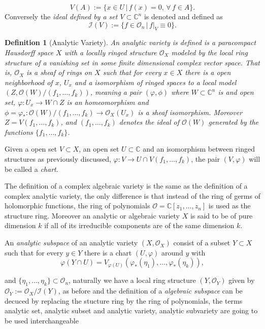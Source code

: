 \documentclass[12pt,twoside,a4paper]{report}
\newtheorem{definition}{Definition}[section]
\newcommand{\co}{\ensuremath{\mathbb C }}
\newcommand{\con}{\ensuremath{\mathbb{C}^n}}
\newcommand{\osheaf}{\ensuremath{\mathcal O }}
\begin{document}
  \[
    V(A):=\{x\in U\,\vert\,f(x)=0,\,\forall\,f\in A\}.
  \]
  \noindent Conversely the \emph{ideal defined by a set $V\subset\con$} is denoted and defined as
  \[
    \mathcal{I}(V):=\{f\in\osheaf_{n}\,|\,f|_{V}\equiv0\}.
  \]
  \begin{definition}[Analytic Variety]
    An \emph{analytic variety} is defined is a paracompact Hausdorff space $X$ with a locally ringed structure $\osheaf_{X}$ modeled by the local ring structure of a vanishing set in some finite dimensional complex vector space. That is, $\osheaf_{X}$ is a sheaf of rings on $X$ such that for every $x\in X$ there is a open neighborhood of $x$, $U_{x}$ and a isomorphism of ringed spaces to a local model $(Z,\osheaf(W)/(f_{1},\dots,f_{k}))$, meaning a pair $(\varphi,\phi)$ where $W\subset\con$ is and open set, $\varphi:U_{x}\rightarrow W\cap Z$ is an homeomorphism and $\phi=\varphi_{*}:\osheaf(W)/(f_{1},\dots,f_{k})\rightarrow\osheaf_{X}(U_{x})$ is a sheaf isomorphism. Moreover $Z=V(f_{1},\dots,f_{k})$, and $(f_{1},\dots,f_{k})$ denotes the ideal of $\osheaf(W)$ generated by the functions $\{f_{1},\dots,f_{k}\}$.
  \end{definition}
  \noindent Given a open set $V\subset X$, an open set $U\subset\co$ and an isomorphism between ringed structures as previously discussed, $\varphi:V\rightarrow U\cap V(f_{1},\dots,f_{k})$, the pair $(V,\varphi)$ will be called a \emph{chart}.

  The definition of a complex algebraic variety is the same as the definition of a complex analytic variety, the only difference is that instead of the ring of germs of holomorphic functions, the ring of polynomials $\osheaf=\co[z_{1},\dots,z_{n}]$ is used as the structure ring. Moreover an analytic or algebraic variety $X$ is said to be of pure dimension $k$ if all of its irreducible components are of the same dimension $k$.

  An \emph{analytic subspace} of an analytic variety $(X,\osheaf_{X})$ consist of a subset $Y\subset X$ such that for every $y\in Y$ there is a chart $(U,\varphi)$ around $y$ with
  \[
    \varphi(Y\cap U)=V_{\varphi(U)}(\varphi_{*}(\eta_1),\dots,\varphi_{*}(\eta_k)),
  \]

  \noindent and $\lbrace\eta_1,\dots,\eta_k\rbrace\subset\osheaf_{n}$, naturally we have a local ring structure $(Y,\osheaf_{Y})$ given by $\osheaf_Y:=\osheaf_{X}/\mathcal{I}(Y)$, as before and the definition of a \emph{algebraic subspace} can be decuced by replacing the stucture ring by the ring of polynomials, the terms analytic set, analytic subset and analytic variety, analytic subvariety are going to be used interchangeable
\end{document}
